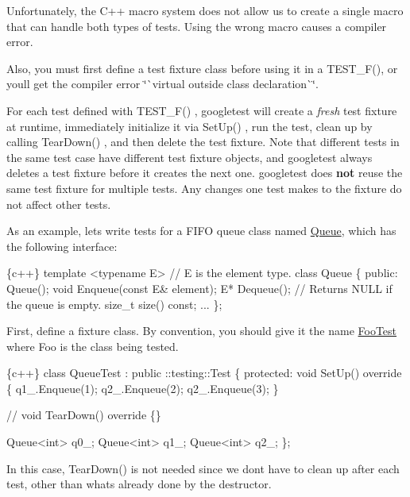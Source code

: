 Unfortunately, the C++ macro system does not allow us to create a single macro that can handle both types of tests. Using the wrong macro causes a compiler error.

Also, you must first define a test fixture class before using it in a {\ttfamily T\+E\+S\+T\+\_\+\+F()}, or you\textquotesingle{}ll get the compiler error \char`\"{}\`{}virtual outside class
declaration\`{}\char`\"{}.

For each test defined with {\ttfamily T\+E\+S\+T\+\_\+\+F()} , googletest will create a {\itshape fresh} test fixture at runtime, immediately initialize it via {\ttfamily Set\+Up()} , run the test, clean up by calling {\ttfamily Tear\+Down()} , and then delete the test fixture. Note that different tests in the same test case have different test fixture objects, and googletest always deletes a test fixture before it creates the next one. googletest does {\bfseries not} reuse the same test fixture for multiple tests. Any changes one test makes to the fixture do not affect other tests.

As an example, let\textquotesingle{}s write tests for a F\+I\+FO queue class named {\ttfamily \mbox{\hyperlink{class_queue}{Queue}}}, which has the following interface\+:


\begin{DoxyCode}
\{c++\}
template <typename E>  // E is the element type.
class Queue \{
 public:
  Queue();
  void Enqueue(const E& element);
  E* Dequeue();  // Returns NULL if the queue is empty.
  size\_t size() const;
  ...
\};
\end{DoxyCode}


First, define a fixture class. By convention, you should give it the name {\ttfamily \mbox{\hyperlink{class_foo_test}{Foo\+Test}}} where {\ttfamily Foo} is the class being tested.


\begin{DoxyCode}
\{c++\}
class QueueTest : public ::testing::Test \{
 protected:
  void SetUp() override \{
     q1\_.Enqueue(1);
     q2\_.Enqueue(2);
     q2\_.Enqueue(3);
  \}

  // void TearDown() override \{\}

  Queue<int> q0\_;
  Queue<int> q1\_;
  Queue<int> q2\_;
\};
\end{DoxyCode}


In this case, {\ttfamily Tear\+Down()} is not needed since we don\textquotesingle{}t have to clean up after each test, other than what\textquotesingle{}s already done by the destructor.


